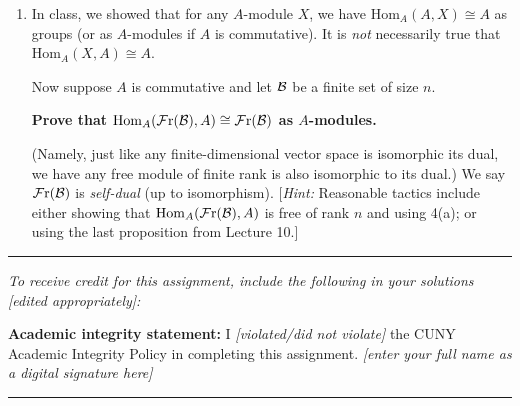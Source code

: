 \documentclass[11pt, reqno]{amsart}
\theoremstyle{plain}
\theoremstyle{definition}
\theoremstyle{example}
\def\Hom{\mathrm{Hom}}
\def\Fr{\mathcal{F}\mathrm{r}}
\begin{document}
\begin{enumerate}[1.]
\begin{enumerate}
\end{enumerate}
\item In class, we showed that for any $A$-module $X$, we have $\Hom_A(A,X) \cong A$ as groups (or as $A$-modules if $A$ is commutative). It is \emph{not} necessarily true that $\Hom_A(X,A) \cong A$. 

\medskip

Now  suppose $A$ is commutative and let $\mathcal{B}$ be a finite set of size $n$. 

\smallskip
\centerline{\textbf{Prove that $\Hom_A(\Fr(\cB), A) \cong \Fr(\cB)$ as $A$-modules.}} (Namely,  just like any finite-dimensional vector space is isomorphic its dual, we have any free module of finite rank is also isomorphic to its dual.) We say $\Fr(\cB)$ is \emph{self-dual} (up to isomorphism). {[\emph{Hint:} Reasonable tactics include either showing that $\Hom_A(\Fr(\cB), A)$ is free  of rank $n$ and using 4(a); or using the last proposition from Lecture 10.]}
\end{enumerate}

\vfill


\hrule
\emph{\small To receive credit for this assignment, include the following in your solutions [edited appropriately]:}

\smallskip

\textbf{Academic integrity statement:} I \emph{[violated/did not violate]} the CUNY Academic Integrity Policy in completing this assignment. \hfill \emph{[enter your full name as a digital signature here]}

\medskip
\hrule

\vfill
\end{document}
